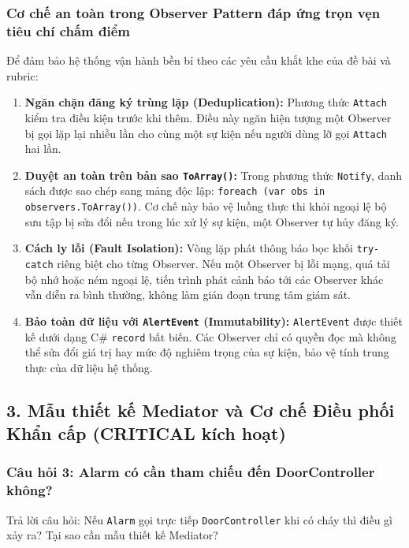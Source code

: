 \documentclass[11pt,a4paper]{article}
\begin{document}
\subsubsection{Cơ chế an toàn trong Observer Pattern đáp ứng trọn vẹn tiêu chí chấm điểm}
Để đảm bảo hệ thống vận hành bền bỉ theo các yêu cầu khắt khe của đề bài và rubric:
\begin{enumerate}[itemsep=1.2pt]
    \item \textbf{Ngăn chặn đăng ký trùng lặp (Deduplication):} Phương thức \texttt{Attach} kiểm tra điều kiện trước khi thêm. Điều này ngăn hiện tượng một Observer bị gọi lặp lại nhiều lần cho cùng một sự kiện nếu người dùng lỡ gọi \texttt{Attach} hai lần.
    \item \textbf{Duyệt an toàn trên bản sao \texttt{ToArray()}:} Trong phương thức \texttt{Notify}, danh sách được sao chép sang mảng độc lập: \texttt{foreach (var obs in observers.ToArray())}. Cơ chế này bảo vệ luồng thực thi khỏi ngoại lệ bộ sưu tập bị sửa đổi nếu trong lúc xử lý sự kiện, một Observer tự hủy đăng ký.
    \item \textbf{Cách ly lỗi (Fault Isolation):} Vòng lặp phát thông báo bọc khối \texttt{try-catch} riêng biệt cho từng Observer. Nếu một Observer bị lỗi mạng, quá tải bộ nhớ hoặc ném ngoại lệ, tiến trình phát cảnh báo tới các Observer khác vẫn diễn ra bình thường, không làm gián đoạn trung tâm giám sát.
    \item \textbf{Bảo toàn dữ liệu với \texttt{AlertEvent} (Immutability):} \texttt{AlertEvent} được thiết kế dưới dạng C\# \texttt{record} bất biến. Các Observer chỉ có quyền đọc mà không thể sửa đổi giá trị hay mức độ nghiêm trọng của sự kiện, bảo vệ tính trung thực của dữ liệu hệ thống.
\end{enumerate}

\newpage

\subsection{3. Mẫu thiết kế Mediator và Cơ chế Điều phối Khẩn cấp (CRITICAL kích hoạt)}

\subsubsection{Câu hỏi 3: Alarm có cần tham chiếu đến DoorController không?}
Trả lời câu hỏi: Nếu \texttt{Alarm} gọi trực tiếp \texttt{DoorController} khi có cháy thì điều gì xảy ra? Tại sao cần mẫu thiết kế Mediator?
\end{document}
